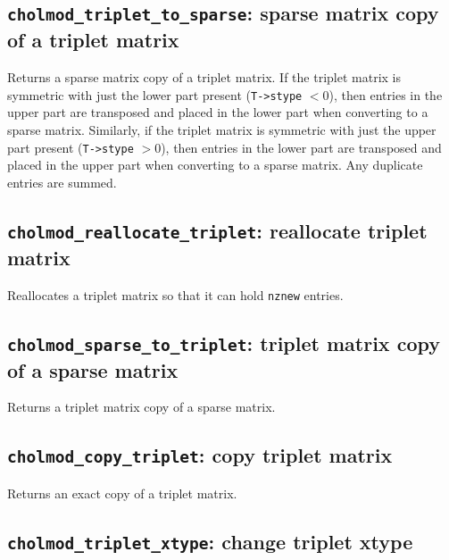 \documentclass[11pt]{article}
\begin{document}
\subsection{{\tt cholmod\_triplet\_to\_sparse}: sparse matrix copy of a triplet
matrix}


Returns a sparse matrix copy of a triplet matrix.  If the triplet matrix is
symmetric with just the lower part present ({\tt T->stype} $< 0$), then entries
in the upper part are transposed and placed in the lower part when converting
to a sparse matrix.  Similarly, if the triplet matrix is symmetric with just
the upper part present ({\tt T->stype} $> 0$), then entries in the lower part
are transposed and placed in the upper part when converting to a sparse matrix.
Any duplicate entries are summed.

\subsection{{\tt cholmod\_reallocate\_triplet}: reallocate triplet matrix}


Reallocates a triplet matrix so that it can hold {\tt nznew} entries.

\subsection{{\tt cholmod\_sparse\_to\_triplet}: triplet matrix copy of a sparse matrix}


Returns a triplet matrix copy of a sparse matrix.

\subsection{{\tt cholmod\_copy\_triplet}: copy triplet matrix}


Returns an exact copy of a triplet matrix.

\subsection{{\tt cholmod\_triplet\_xtype}: change triplet xtype}
\end{document}
